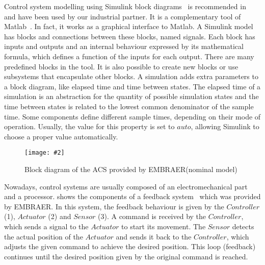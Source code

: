 \documentclass[en,twoside,onehalfspacing,phd]{risethesis}
\newcommand{\includegraphicsaspectratio}[2][1]{%
  \texttt{[image: \#2]}%
}
\newcommand{\EMBRAER}{EMBRAER\xspace}
\newcommand{\matlab}{\textsf{Matlab}\xspace}
\newcommand{\textsim}[1]{$#1$}
\newcommand{\simulink}{Simulink\xspace}
\begin{document}
Control system modelling using \simulink block diagrams~\cite{MathWorks2010} is recommended in~\cite{Nise1992} and have been used by our industrial partner.
It is a complementary tool of \matlab~\cite{MathWorks2010c}.
In fact, it works as a graphical interface to \matlab.
A \simulink model has blocks and connections between these blocks, named signals.
Each block has inputs and outputs and an internal behaviour expressed by its mathematical formula, which defines a function of the inputs for each output.
There are many predefined blocks in the tool.
It is also possible to create new blocks or use subsystems that encapsulate other blocks.
A simulation adds extra parameters to a block diagram, like elapsed time and time between states.
The elapsed time of a simulation is an abstraction for the quantity of possible simulation states and the time between states is related to the lowest common denominator of the sample time.
Some components define different sample times, depending on their mode of operation.
Usually, the value for this property is set to \textsim{auto}, allowing \simulink to choose a proper value automatically.

\begin{figure}[t] \centering
  \includegraphicsaspectratio{acsBlockDiagrams}
  \caption{Block diagram of the ACS provided by \EMBRAER (nominal model)}
  \label{fg:acsBlockDiagrams}
\end{figure}

Nowadays, control systems are usually composed of an electromechanical part and a processor.
 shows the components of a feedback system~\cite{AM2008} which was provided by \EMBRAER.
In this system, the feedback behaviour is given by the \textsim{Controller} (1), \textsim{Actuator} (2) and \textsim{Sensor} (3). A command is received by the \textsim{Controller}, which sends a signal to the \textsim{Actuator} to start its movement.
The \textsim{Sensor} detects the actual position of the \textsim{Actuator} and sends it back to the \textsim{Controller}, which adjusts the given command to achieve the desired position. This loop (feedback) continues until the desired position given by the original command is reached.
\end{document}
